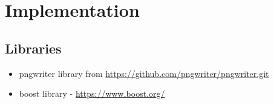 \documentclass[12pt, a4paper]{article}
\begin{document}
\section{Implementation}

\subsection{Libraries}
\begin{itemize}
    \item pngwriter library from \url{https://github.com/pngwriter/pngwriter.git}
    \item boost library - \url{https://www.boost.org/} 
\end{itemize}
\end{document}
